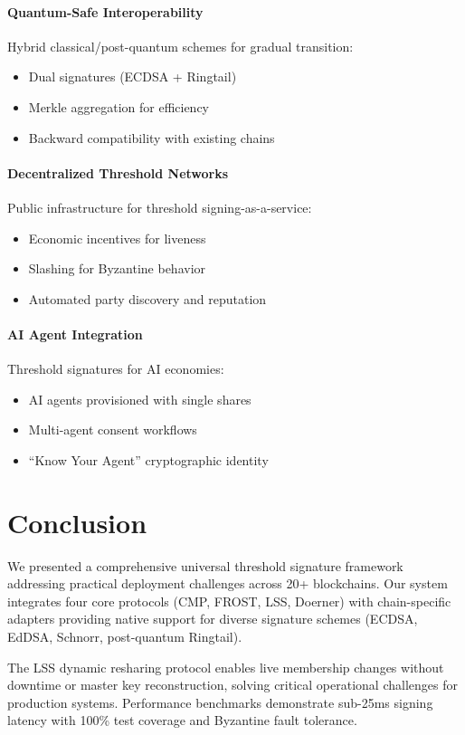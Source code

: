 \documentclass[11pt,twocolumn]{article}
\begin{document}
\paragraph{Quantum-Safe Interoperability} Hybrid classical/post-quantum schemes for gradual transition:
\begin{itemize}
\item Dual signatures (ECDSA + Ringtail)
\item Merkle aggregation for efficiency
\item Backward compatibility with existing chains
\end{itemize}

\paragraph{Decentralized Threshold Networks} Public infrastructure for threshold signing-as-a-service:
\begin{itemize}
\item Economic incentives for liveness
\item Slashing for Byzantine behavior
\item Automated party discovery and reputation
\end{itemize}

\paragraph{AI Agent Integration} Threshold signatures for AI economies:
\begin{itemize}
\item AI agents provisioned with single shares
\item Multi-agent consent workflows
\item ``Know Your Agent'' cryptographic identity
\end{itemize}

\section{Conclusion}

We presented a comprehensive universal threshold signature framework addressing practical deployment challenges across 20+ blockchains. Our system integrates four core protocols (CMP, FROST, LSS, Doerner) with chain-specific adapters providing native support for diverse signature schemes (ECDSA, EdDSA, Schnorr, post-quantum Ringtail).

The LSS dynamic resharing protocol enables live membership changes without downtime or master key reconstruction, solving critical operational challenges for production systems. Performance benchmarks demonstrate sub-25ms signing latency with 100\% test coverage and Byzantine fault tolerance.
\end{document}
